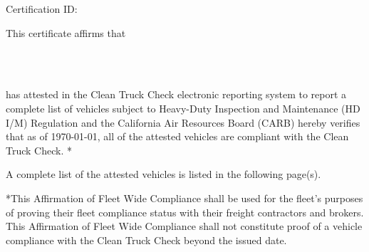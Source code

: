 {
    \setlength{\parskip}{\baselineskip}
    \setlength{\parindent}{0pt}

    Certification ID: \CertificateID

    This certificate affirms that

    \CarrierName         \\
    \CarrierAddress      \\
    \CarrierMunicipality

    has attested in the Clean Truck Check electronic reporting system to report
    a complete list of vehicles subject to Heavy-Duty Inspection and Maintenance
    (HD I/M) Regulation and the California Air Resources Board (CARB) hereby
    verifies that as of \today, all of the attested vehicles are compliant
    with the Clean Truck Check. *

    A complete list of the attested vehicles is listed in the following page(s).

    *This Affirmation of Fleet Wide Compliance shall be used for the fleet's
    purposes of proving their fleet compliance status with their freight
    contractors and brokers. This Affirmation of Fleet Wide Compliance shall not
    constitute proof of a vehicle compliance with the Clean Truck Check beyond
    the issued date.
}